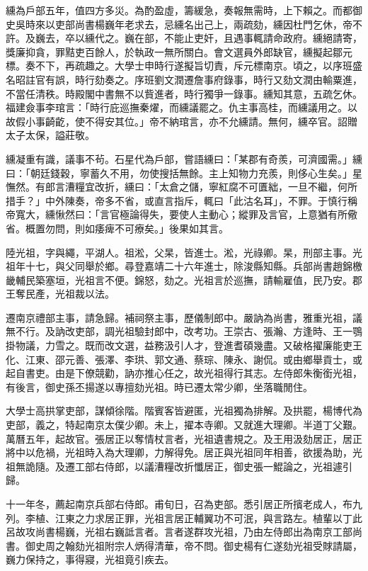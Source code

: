 \begin{pinyinscope}
纁為戶部五年，值四方多災。為酌盈虛，籌緩急，奏報無需時，上下賴之。而都御史吳時來以吏部尚書楊巍年老求去，忌纁名出己上，兩疏劾，纁因杜門乞休，帝不許。及巍去，卒以纁代之。巍在部，不能止吏奸，且遇事輒請命政府。纁絕請寄，獎廉抑貪，罪黠吏百餘人，於執政一無所關白。會文選員外郎缺官，纁擬起鄒元標。奏不下，再疏趣之。大學士申時行遂擬旨切責，斥元標南京。頃之，以序班盛名昭註官有誤，時行劾奏之。序班劉文潤遷詹事府錄事，時行又劾文潤由輸粟進，不當任清秩。時殿閣中書無不以貲進者，時行獨爭一錄事。纁知其意，五疏乞休。福建僉事李琯言：「時行庇巡撫秦燿，而纁議罷之。仇主事高桂，而纁議用之。以故假小事齮齕，使不得安其位。」帝不納琯言，亦不允纁請。無何，纁卒官。詔贈太子太保，謚莊敬。

纁凝重有識，議事不茍。石星代為戶部，嘗語纁曰：「某郡有奇羨，可濟國需。」纁曰：「朝廷錢穀，寧蓄久不用，勿使搜括無餘。主上知物力充羨，則侈心生矣。」星憮然。有郎言漕糧宜改折，纁曰：「太倉之儲，寧紅腐不可匱絀，一旦不繼，何所措手？」中外陳奏，帝多不省，或直言指斥，輒曰「此沽名耳」，不罪。于慎行稱帝寬大，纁愀然曰：「言官極論得失，要使人主動心；縱罪及言官，上意猶有所儆省。概置勿問，則如痿痺不可療矣。」後果如其言。

陸光祖，字與繩，平湖人。祖淞，父杲，皆進士。淞，光祿卿。杲，刑部主事。光祖年十七，與父同舉於鄉。尋登嘉靖二十六年進士，除浚縣知縣。兵部尚書趙錦檄畿輔民築塞垣，光祖言不便。錦怒，劾之。光祖言於巡撫，請輸雇值，民乃安。郡王奪民產，光祖裁以法。

遷南京禮部主事，請急歸。補祠祭主事，歷儀制郎中。嚴訥為尚書，雅重光祖，議無不行。及訥改吏部，調光祖驗封郎中，改考功。王崇古、張瀚、方逢時、王一鶚掛物議，力雪之。既而改文選，益務汲引人才，登進耆碩幾盡。又破格擢廉能吏王化、江東、邵元善、張澤、李珙、郭文通、蔡琮、陳永、謝侃。或由鄉舉貢士，或起自書吏。由是下僚競勸，訥亦推心任之，故光祖得行其志。左侍郎朱衡銜光祖，有後言，御史孫丕揚遂以專擅劾光祖。時已遷太常少卿，坐落職閒住。

大學士高拱掌吏部，謀傾徐階。階賓客皆避匿，光祖獨為排解。及拱罷，楊博代為吏部，義之，特起南京太僕少卿。未上，擢本寺卿。又就進大理卿。半道丁父艱。萬曆五年，起故官。張居正以奪情杖言者，光祖遺書規之。及王用汲劾居正，居正將中以危禍，光祖時入為大理卿，力解得免。居正與光祖同年相善，欲援為助，光祖無詭隨。及遷工部右侍郎，以議漕糧改折懺居正，御史張一鯤論之，光祖遽引歸。

十一年冬，薦起南京兵部右侍郎。甫旬日，召為吏部。悉引居正所擯老成人，布九列。李植、江東之力求居正罪，光祖言居正輔翼功不可泯，與言路左。植輩以丁此呂故攻尚書楊巍，光祖右巍詆言者。言者遂群攻光祖，乃由左侍郎出為南京工部尚書。御史周之翰劾光祖附宗人炳得清華，帝不問。御史楊有仁遂劾光祖受賕請屬，巍力保持之，事得寢，光祖竟引疾去。


\end{pinyinscope}
